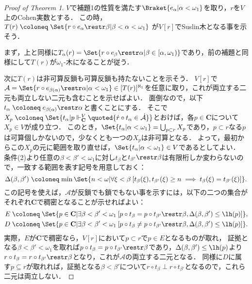 \documentclass[a4j]{ltjsarticle}
\renewcommand{\defeq}{\mathrel{\coloneq}}
\begin{document}
\begin{proof}[Proof of Theorem 1]
 $V$で補題1の性質を満たす$\Braket{e_\alpha | \alpha < \omega_1}$を取り，$r$を$V$上のCohen実数とする．
 この時，$T(r) \defeq \Set{r \circ e_\alpha \restr \beta | \beta < \alpha < \omega_1}$ が$V[r]$でSuslin木となる事を示そう．

 まず，上と同様に$T_\alpha(r) = \Set{ r \circ e_\beta \restr \alpha | \beta \in [\alpha, \omega_1)}$であり，前の補題と同様にして$T(r)$が$\omega_1$-木になることが従う．

 次に$T(r)$は非可算反鎖も可算反鎖も持たないことを示そう．
 $V[r]$で$\mathcal{A} = \Set{ r \circ e_{\beta(\alpha)} \restr \alpha | \alpha < \omega_1} \in [T(r)]^{\aleph_1}$を任意に取り，これが両立する二元も両立しない二元も含むことを示せばよい．
 面倒なので，以下$t_\alpha \defeq e_{\beta(\alpha)} \restr \alpha$と書くことにする．
 そこで$X_p \defeq \Set{t_\alpha | p \Vdash^{V}_{\mathbf{C}} \quoted{\dot{r} \circ t_\alpha \in \dot{\mathcal{A}}}}$とおけば，各$p \in \mathbf{C}$について$X_p \in V$が成り立つ．
 このとき，$\Set{t_\alpha | \alpha < \omega_1} = \bigcup_{p \subset r} X_p$であり，$p \subset r$なる$p$は可算個しかないので，少なくとも一つの$X_p$は非可算となる．
 よって，最初からこの$X_p$の元に範囲を取り直せば，$\Set{t_\alpha | \alpha < \omega_1} \in V$であるとしてよい．
 条件(2)より任意の$\beta < \beta' < \omega_1$に対し$t_\beta$と$t_{\beta'} \restr \beta$は有限桁しか変わらないので，一致する範囲を表す記号を用意しておく：
 \[
  \Delta(\beta, \beta') \defeq \min\Set{ n < \omega | \forall \xi < \beta \: [t_\beta(\xi), t_{\beta'}(\xi) \geq n \implies t_\beta(\xi) = t_{\beta'}(\xi)]}.
 \]
 この記号を使えば，$\mathcal{A}$が反鎖でも鎖でもない事を示すには，以下の二つの集合がそれぞれ$\mathbf{C}$で稠密となることが示せればよい：
 \begin{align*}
  E &\defeq \Set{p \in \mathbf{C} | \exists \beta < \beta' < \omega_1 \: [p \circ t_\beta = p \circ t_{\beta'} \restr \beta, \Delta(\beta, \beta') \leq \lh(p)] },\\
  D &\defeq \Set{p \in \mathbf{C} | \exists \beta < \beta' < \omega_1 \: [p \circ t_\beta \neq p \circ t_{\beta'} \restr \beta, \Delta(\beta, \beta') \leq \lh(p)]}.
 \end{align*}
 実際，$E$が$\mathbf{C}$で稠密なら，$V[r]$において$p \subset r$で$p \in E$となるものが取れ，
 証拠となる$\beta < \beta' < \omega_1$を取れば$p \circ t_\beta = p \circ t_{\beta'} \restr \beta$であり，$\Delta(\beta, \beta') \leq \lh(p)$より$r \circ t_\beta = r \circ t_{\beta'} \restr \beta$となり，これが$\mathcal{A}$の両立する二元となる．
 同様に$D$に属す$p \subseteq r$が取れれば，証拠となる$\beta < \beta'$について$r \circ t_{\beta} \perp r \circ t_{\beta'}$となるので，これら二元は両立しない．


\end{proof}
\end{document}
